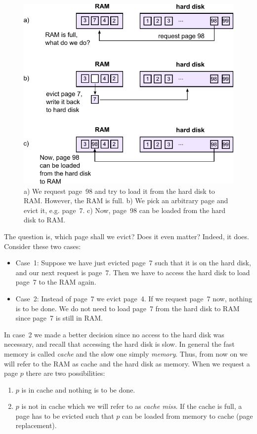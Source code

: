 \documentclass[a4paper,12pt, titlepage]{article}  %
\begin{document}
\begin{figure}[ht]
\centering
\includegraphics[scale=1.0]{./figures/RAM_hdd_page_part2.pdf}
\caption{a) We request page~98 and try to load it from the hard disk to RAM.
However, the RAM is full. b) We pick an arbitrary page and evict it, e.g. page~7.
c) Now, page~98 can be loaded from the hard disk to RAM.}
\end{figure}

The question is, which page shall we evict? Does it even matter? Indeed, it does. 
Consider these two cases: 
\begin{itemize}
\item Case~1: Suppose we have just evicted page~7 such that it is on 
the hard disk, and our next request is page~7. Then we have to access the hard disk  
to load page~7 to the RAM again.  
\item Case~2: Instead of page~7 we evict page~4. If we request page~7 now,
nothing is to be done. We do not need to load page~7 from the hard disk to RAM since 
page~7 is still in RAM.
\end{itemize}

In case~2 we made a better decision since no access to the hard disk was necessary, 
and recall that accessing the hard disk is slow. 
In general the fast memory is called \emph{cache} and the slow one simply \emph{memory}.
Thus, from now on we will refer to the RAM as cache and the hard disk as memory. 
When we request a page $p$ there are two possibilities: 
\begin{enumerate}
	\item $p$ is in cache and nothing is to be done.
	\item $p$ is not in cache which we will refer to as \emph{cache miss}.
	      If the cache is full, a page has to be evicted such that $p$ can be loaded 
	      from memory to cache (page replacement). 
\end{enumerate}
\end{document}
